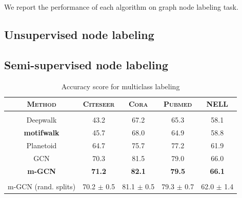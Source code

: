 \documentclass{article}
\theoremstyle{definition}
\begin{document}
We report the performance of each algorithm on graph node
labeling task.

\subsection{Unsupervised node labeling}

\begin{table}[H]
\centering
{}
\caption{F1-macro score for multiclass labeling}
\label{t:re}
\end{table}

\subsection{Semi-supervised node labeling}

\begin{table}[H]
\centering
\begin{tabular}{c | c c c c}
\textbf{\textsc{Method}} & \textsc{Citeseer} & \textsc{Cora} & \textsc{Pubmed} & \textsc{NELL} \\
\hline \\
Deepwalk & 43.2 & 67.2 & 65.3 & 58.1 \\
\textbf{motifwalk} & 45.7 & 68.0 & 64.9 & 58.8 \\
Planetoid & 64.7 & 75.7 & 77.2 & 61.9 \\
GCN & 70.3 & 81.5 & 79.0 & 66.0 \\
\textbf{m-GCN} & \textbf{71.2} & \textbf{82.1} & \textbf{79.5} & \textbf{66.1} \\
\hline \\
m-GCN (rand. splits) & 70.2 $\pm$ 0.5 & 81.1 $\pm$ 0.5 & 79.3 $\pm$ 0.7 & 62.0 $\pm$ 1.4 \\
\end{tabular}%
\caption{Accuracy score for multiclass labeling}
\label{t:re}
\end{table}
\end{document}
